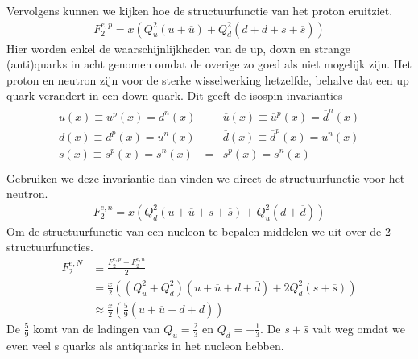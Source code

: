 \documentclass[../main.tex]{subfiles}
\begin{document}
Vervolgens kunnen we kijken hoe de structuurfunctie van het proton eruitziet.
\begin{equation}
    \begin{aligned}
        \label{eq:struct_func_proton}
        F_2^{e,p} = x\left(Q_u^2(u+\overline u) + Q_d^2(d+\overline d + s + \overline s)\right)
    \end{aligned}
\end{equation}
Hier worden enkel de waarschijnlijkheden van de up, down en strange (anti)quarks in acht genomen omdat de overige zo goed als niet mogelijk zijn. Het proton en neutron zijn voor de sterke wisselwerking hetzelfde, behalve dat een up quark verandert in een down quark. Dit geeft de isospin invarianties
\begin{equation}
    \begin{aligned}
        \label{eq:isospin_invariantie}
        \begin{matrix}
            u(x) \equiv u^p(x) = d^n(x) &   & \overline u(x) \equiv \overline u^p(x) = \overline d^n(x) \\
            d(x) \equiv d^p(x) = u^n(x) &   & \overline d(x) \equiv \overline d^p(x) = \overline u^n(x) \\
            s(x) \equiv s^p(x) = s^n(x) & = & \overline s^p(x) = \overline s^n(x)                       \\
        \end{matrix}
    \end{aligned}
\end{equation}
Gebruiken we deze invariantie dan vinden we direct de structuurfunctie voor het neutron.
\begin{equation}
    \begin{aligned}
        \label{eq:struct_func_neutron}
        F_2^{e,n} = x\left(Q_d^2(u+\overline u + s + \overline s) + Q_u^2(d+\overline d)\right)
    \end{aligned}
\end{equation}
Om de structuurfunctie van een nucleon te bepalen middelen we uit over de 2 structuurfuncties.
\begin{equation}
    \begin{aligned}
        \label{eq:struct_func_nucleon}
        F_2^{e,N} &\equiv \frac{F_2^{e,p}+F_2^{e,n}}{2}\\
                  &= \frac{x}{2} \left((Q_u^2+Q_d^2)(u+\overline u + d + \overline d) + 2Q_d^2(s+\overline s)\right)\\
                  &\approx \frac{x}{2} \left( \frac{5}{9} (u+\overline u + d + \overline d)\right)
    \end{aligned}
\end{equation}
De $ \frac{5}{9} $ komt van de ladingen van $Q_u = \frac{2}{3} $ en $Q_d = -\frac{1}{3} $. De $s+\bar{s}$ valt weg omdat we even veel s quarks als antiquarks in het nucleon hebben.
\end{document}
